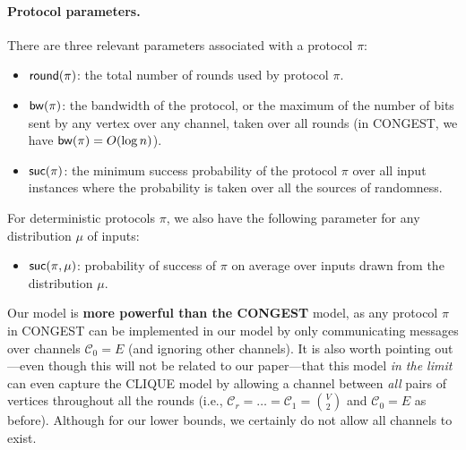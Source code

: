 \documentclass[11pt]{article}
\theoremstyle{definition}
\newcommand{\rv}[1]{\ensuremath{{\mathsf{#1}}}\xspace}
\newcommand{\prot}{\ensuremath{\pi}}
\newcommand{\suc}{\ensuremath{\textnormal{\textsf{suc}}}}
\newcommand{\round}{\ensuremath{\textnormal{\textsf{round}}}}
\newcommand{\bwidth}{\ensuremath{\textnormal{\textsf{bw}}}}
\newcommand{\cC}{\ensuremath{\mathcal{C}}}
\begin{document}
\paragraph{Protocol parameters.} 
There are three relevant parameters associated with a protocol $\prot$:
\begin{itemize}
	\item $\round(\prot)$: the total number of rounds used by protocol $\prot$. 
	\item $\bwidth(\prot)$: the bandwidth of the protocol, or the maximum of the number of bits sent by any vertex over any channel, taken over all rounds (in CONGEST, we have $\bwidth(\prot)=O(\log{n})$).
	\item $\suc(\prot)$: the minimum success probability of the protocol $\prot$ over all input instances where the probability is taken over all the sources of randomness. 
\end{itemize}
For deterministic protocols $\prot$, we also have the following parameter for any distribution $\mu$ of inputs:
\begin{itemize}
	\item $\suc(\prot, \mu)$: probability of success of $\prot$ on average over inputs drawn from the distribution $\mu$. 
\end{itemize}

Our model is \textbf{more powerful than the CONGEST} model, as any protocol $\prot$ in CONGEST can be implemented in our model by only 
communicating messages over channels $\cC_0=E$ (and ignoring other channels). It is also worth pointing out---even though this will not be related to our paper---that this model \emph{in the limit} can even capture the CLIQUE model by allowing a channel between \emph{all} pairs of vertices throughout all the rounds (i.e., $\cC_r = \ldots = \cC_1 = {{V}\choose{2}}$ and $\cC_0=E$ as before). Although for our lower bounds, we certainly do not allow all channels to exist. 

\clearpage


\newcommand{\GG}{\ensuremath{\mathcal{G}}}
\newcommand{\jstar}{\ensuremath{j}^{\star}}

\newcommand{\rM}{\rv{M}}
\newcommand{\rN}{\rv{N}}

\newcommand{\rI}{\rv{I}}


\newcommand{\Astar}{\ensuremath{A^*}}
\newcommand{\Bstar}{\ensuremath{B^*}}
\newcommand{\Cstar}{\ensuremath{C^*}}
\end{document}
